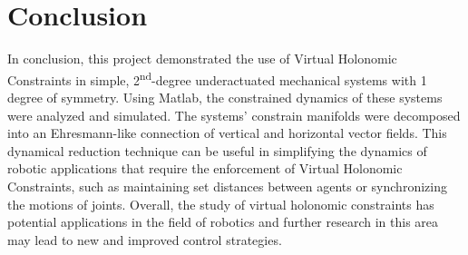 \documentclass[main.tex]{subfiles}
\begin{document}
\chapter{Conclusion}
In conclusion, this project demonstrated the use of Virtual Holonomic Constraints in simple, 2\textsuperscript{nd}-degree underactuated mechanical systems with 1 degree of symmetry. Using Matlab, the constrained dynamics of these systems were analyzed and simulated. The systems' constrain manifolds were decomposed into an Ehresmann-like connection of vertical and horizontal vector fields. This dynamical reduction technique can be useful in simplifying the dynamics of robotic applications that require the enforcement of Virtual Holonomic Constraints, such as maintaining set distances between agents or synchronizing the motions of joints. Overall, the study of virtual holonomic constraints has potential applications in the field of robotics and further research in this area may lead to new and improved control strategies.
\end{document}
